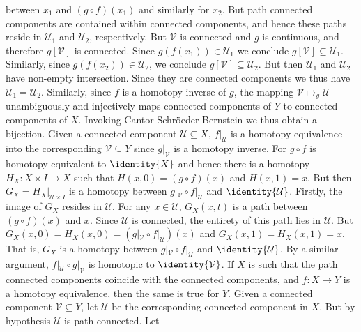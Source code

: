 \documentclass{article}                                                        %
\begin{document}
\begin{solution}
        between $x_{1}$ and $(g\circ{f})(x_{1})$ and similarly for $x_{2}$. But
        path connected components are contained within connected components, and
        hence these paths reside in $\mathcal{U}_{1}$ and $\mathcal{U}_{2}$,
        respectively. But $\mathcal{V}$ is connected and $g$ is continuous, and
        therefore $g[\mathcal{V}]$ is connected. Since
        $g(f(x_{1}))\in\mathcal{U}_{1}$ we conclude
        $g[\mathcal{V}]\subseteq\mathcal{U}_{1}$. Similarly, since
        $g(f(x_{2}))\in\mathcal{U}_{2}$, we conclude
        $g[\mathcal{V}]\subseteq\mathcal{U}_{2}$. But then $\mathcal{U}_{1}$ and
        $\mathcal{U}_{2}$ have non-empty intersection. Since they are connected
        components we thus have $\mathcal{U}_{1}=\mathcal{U}_{2}$. Similarly,
        since $f$ is a homotopy inverse of $g$, the mapping
        $\mathcal{V}\mapsto_{g}\mathcal{U}$ unambiguously and injectively maps 
        connected components of $Y$ to connected components of $X$. Invoking
        Cantor-Schr\"{o}eder-Bernstein we thus obtain a bijection. Given
        a connected component $\mathcal{U}\subseteq{X}$, $f|_{\mathcal{U}}$ is a
        homotopy equivalence into the corresponding $\mathcal{V}\subseteq{Y}$
        since $g|_{\mathcal{V}}$ is a homotopy inverse. For $g\circ{f}$ is
        homotopy equivalent to $\identity{X}$ and hence there is a homotopy
        $H_{X}:X\times{I}\rightarrow{X}$ such that
        $H(x,0)=(g\circ{f})(x)$ and $H(x,1)=x$. But then
        $G_{X}=H_{X}|_{\mathcal{U}\times{I}}$ is a homotopy between
        $g|_{\mathcal{V}}\circ{f}|_{\mathcal{U}}$ and $\identity{\mathcal{U}}$.
        Firstly, the image of $G_{X}$ resides in $\mathcal{U}$. For any
        $x\in\mathcal{U}$, $G_{X}(x,t)$ is a path between
        $(g\circ{f})(x)$ and $x$. Since $\mathcal{U}$ is connected, the entirety
        of this path lies in $\mathcal{U}$. But
        $G_{X}(x,0)=H_{X}(x,0)=(g|_{\mathcal{V}}\circ{f}|_{\mathcal{U}})(x)$
        and $G_{X}(x,1)=H_{X}(x,1)=x$. That is, $G_{X}$ is a homotopy between
        $g|_{\mathcal{V}}\circ{f}|_{\mathcal{U}}$ and $\identity{\mathcal{U}}$.
        By a similar argument, $f|_{\mathcal{U}}\circ{g}|_{\mathcal{V}}$ is
        homotopic to $\identity{\mathcal{V}}$. If $X$ is such that the path
        connected components coincide with the connected components, and
        $f:X\rightarrow{Y}$ is a homotopy equivalence, then the same is true for
        $Y$. Given a connected component $\mathcal{V}\subseteq{Y}$, let
        $\mathcal{U}$ be the corresponding connected component in $X$. But by
        hypothesis $\mathcal{U}$ is path connected. Let

\end{solution}
\end{document}
